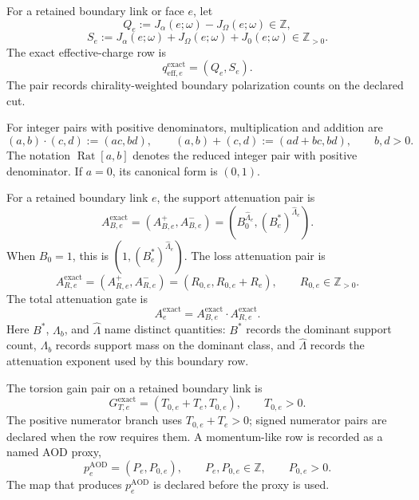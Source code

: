 \begin{definition}
\label{def:qeff-exact-pair}
For a retained boundary link or face \(e\), let
\[
Q_e:=J_{\alpha}(e;\omega)-J_{\Omega}(e;\omega)\in\mathbb Z,
\]
\[
S_e:=J_{\alpha}(e;\omega)+J_{\Omega}(e;\omega)+J_0(e;\omega)\in\mathbb Z_{>0}.
\]
The exact effective-charge row is
\[
q_{\mathrm{eff},e}^{\mathrm{exact}}=(Q_e,S_e).
\]
The pair records chirality-weighted boundary polarization counts on the declared cut.
\end{definition}

\begin{definition}
\label{def:rational-pair-arithmetic}
For integer pairs with positive denominators, multiplication and addition are
\[
(a,b)\cdot(c,d):=(ac,bd),
\qquad
(a,b)+(c,d):=(ad+bc,bd),
\qquad b,d>0.
\]
The notation \(\operatorname{Rat}[a,b]\) denotes the reduced integer pair with positive denominator. If \(a=0\), its canonical form is \((0,1)\).
\end{definition}

\begin{definition}
\label{def:integer-attenuation-pairs}
For a retained boundary link \(e\), the support attenuation pair is
\[
A_{B,e}^{\mathrm{exact}}
=(A_{B,e}^{+},A_{B,e}^{-})
=(B_0^{\widehat\Lambda_e},(B_e^*)^{\widehat\Lambda_e}).
\]
When \(B_0=1\), this is \((1,(B_e^*)^{\widehat\Lambda_e})\). The loss attenuation pair is
\[
A_{R,e}^{\mathrm{exact}}
=(A_{R,e}^{+},A_{R,e}^{-})
=(R_{0,e},R_{0,e}+R_e),
\qquad
R_{0,e}\in\mathbb Z_{>0}.
\]
The total attenuation gate is
\[
A_e^{\mathrm{exact}}=A_{B,e}^{\mathrm{exact}}\cdot A_{R,e}^{\mathrm{exact}}.
\]
Here \(B^*\), \(\Lambda_b\), and \(\widehat\Lambda\) name distinct quantities: \(B^*\) records the dominant support count, \(\Lambda_b\) records support mass on the dominant class, and \(\widehat\Lambda\) records the attenuation exponent used by this boundary row.
\end{definition}

\begin{definition}
\label{def:torsion-momentum-proxy-pairs}
The torsion gain pair on a retained boundary link is
\[
G_{T,e}^{\mathrm{exact}}=(T_{0,e}+T_e,T_{0,e}),
\qquad
T_{0,e}>0.
\]
The positive numerator branch uses \(T_{0,e}+T_e>0\); signed numerator pairs are declared when the row requires them. A momentum-like row is recorded as a named AOD proxy,
\[
p_e^{\mathrm{AOD}}=(P_e,P_{0,e}),
\qquad
P_e,P_{0,e}\in\mathbb Z,
\qquad
P_{0,e}>0.
\]
The map that produces \(p_e^{\mathrm{AOD}}\) is declared before the proxy is used.
\end{definition}

